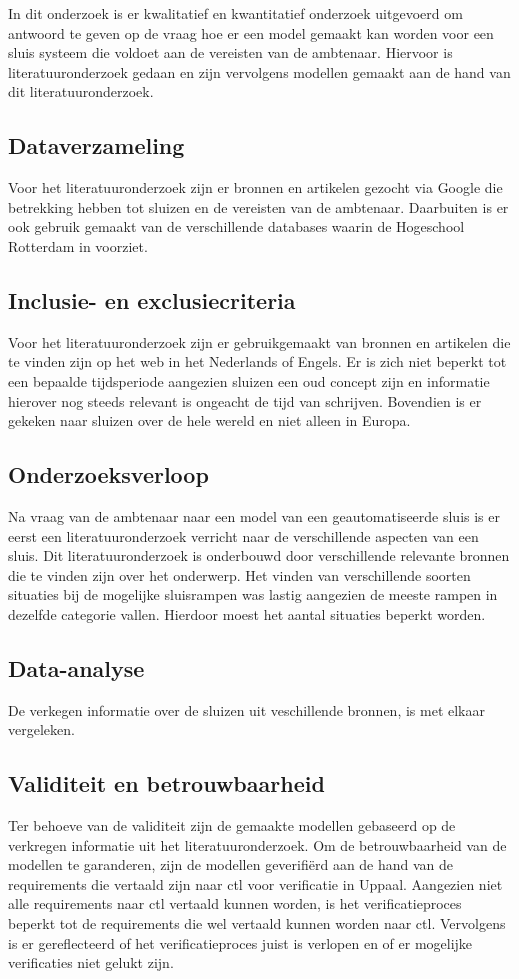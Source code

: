 \documentclass[../verslag.tex]{subfiles}
\begin{document}
In dit onderzoek is er kwalitatief en kwantitatief onderzoek uitgevoerd om antwoord te geven op de vraag hoe er een model gemaakt kan worden voor een sluis systeem die voldoet aan de vereisten van de ambtenaar.
Hiervoor is literatuuronderzoek gedaan en zijn vervolgens modellen gemaakt aan de hand van dit literatuuronderzoek.

\subsection{Dataverzameling}
Voor het literatuuronderzoek zijn er bronnen en artikelen gezocht via Google die betrekking hebben tot sluizen en de vereisten van de ambtenaar.
Daarbuiten is er ook gebruik gemaakt van de verschillende databases waarin de Hogeschool Rotterdam in voorziet.

\subsection{Inclusie- en exclusiecriteria}
Voor het literatuuronderzoek zijn er gebruikgemaakt van bronnen en artikelen die te vinden zijn op het web in het Nederlands of Engels.
Er is zich niet beperkt tot een bepaalde tijdsperiode aangezien sluizen een oud concept zijn en informatie hierover nog steeds relevant is ongeacht de tijd van schrijven.
Bovendien is er gekeken naar sluizen over de hele wereld en niet alleen in Europa.
\subsection{Onderzoeksverloop}
Na vraag van de ambtenaar naar een model van een geautomatiseerde sluis is er eerst een literatuuronderzoek verricht naar de verschillende aspecten van een sluis.
Dit literatuuronderzoek is onderbouwd door verschillende relevante bronnen die te vinden zijn over het onderwerp.
Het vinden van verschillende soorten situaties bij de mogelijke sluisrampen was lastig aangezien de meeste rampen in dezelfde categorie vallen.
Hierdoor moest het aantal situaties beperkt worden.
\subsection{Data-analyse}
De verkegen informatie over de sluizen uit veschillende bronnen, is met elkaar vergeleken.
\subsection{Validiteit en betrouwbaarheid}
Ter behoeve van de validiteit zijn de gemaakte modellen gebaseerd op de verkregen informatie uit het literatuuronderzoek.
Om de betrouwbaarheid van de modellen te garanderen, zijn de modellen geverifiërd aan de hand van de requirements die vertaald zijn naar ctl voor verificatie in Uppaal.
Aangezien niet alle requirements naar ctl vertaald kunnen worden, is het verificatieproces beperkt tot de requirements die wel vertaald kunnen worden naar ctl.
Vervolgens is er gereflecteerd of het verificatieproces juist is verlopen en of er mogelijke verificaties niet gelukt zijn.
\end{document}
